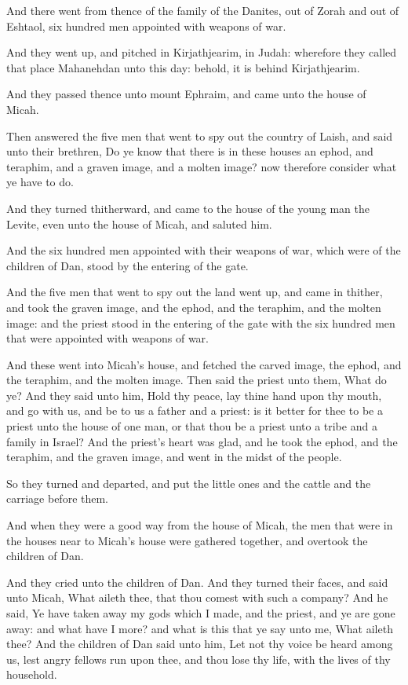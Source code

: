 \verse And there went from thence of the family of the Danites, out of Zorah and out of Eshtaol, six hundred men appointed with weapons of war.

\verse And they went up, and pitched in Kirjathjearim, in Judah: wherefore they called that place Mahanehdan unto this day: behold, it is behind Kirjathjearim.

\verse And they passed thence unto mount Ephraim, and came unto the house of Micah.

\verse Then answered the five men that went to spy out the country of Laish, and said unto their brethren, Do ye know that there is in these houses an ephod, and teraphim, and a graven image, and a molten image?  now therefore consider what ye have to do.

\verse And they turned thitherward, and came to the house of the young man the Levite, even unto the house of Micah, and saluted him.

\verse And the six hundred men appointed with their weapons of war, which were of the children of Dan, stood by the entering of the gate.

\verse And the five men that went to spy out the land went up, and came in thither, and took the graven image, and the ephod, and the teraphim, and the molten image: and the priest stood in the entering of the gate with the six hundred men that were appointed with weapons of war.

\verse And these went into Micah's house, and fetched the carved image, the ephod, and the teraphim, and the molten image. Then said the priest unto them, What do ye?  \verse And they said unto him, Hold thy peace, lay thine hand upon thy mouth, and go with us, and be to us a father and a priest: is it better for thee to be a priest unto the house of one man, or that thou be a priest unto a tribe and a family in Israel?  \verse And the priest's heart was glad, and he took the ephod, and the teraphim, and the graven image, and went in the midst of the people.

\verse So they turned and departed, and put the little ones and the cattle and the carriage before them.

\verse And when they were a good way from the house of Micah, the men that were in the houses near to Micah's house were gathered together, and overtook the children of Dan.

\verse And they cried unto the children of Dan. And they turned their faces, and said unto Micah, What aileth thee, that thou comest with such a company?  \verse And he said, Ye have taken away my gods which I made, and the priest, and ye are gone away: and what have I more? and what is this that ye say unto me, What aileth thee?  \verse And the children of Dan said unto him, Let not thy voice be heard among us, lest angry fellows run upon thee, and thou lose thy life, with the lives of thy household.

